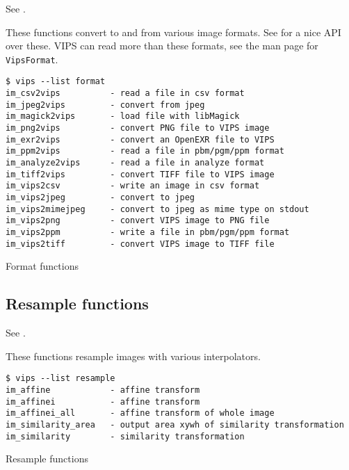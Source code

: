 See .

These functions convert to and from various image formats. See
 for a nice API over these. VIPS can read more than these
formats, see the man page for \verb+VipsFormat+.

\begin{fig2}
\begin{verbatim}
$ vips --list format
im_csv2vips          - read a file in csv format
im_jpeg2vips         - convert from jpeg
im_magick2vips       - load file with libMagick
im_png2vips          - convert PNG file to VIPS image
im_exr2vips          - convert an OpenEXR file to VIPS
im_ppm2vips          - read a file in pbm/pgm/ppm format
im_analyze2vips      - read a file in analyze format
im_tiff2vips         - convert TIFF file to VIPS image
im_vips2csv          - write an image in csv format
im_vips2jpeg         - convert to jpeg
im_vips2mimejpeg     - convert to jpeg as mime type on stdout
im_vips2png          - convert VIPS image to PNG file
im_vips2ppm          - write a file in pbm/pgm/ppm format
im_vips2tiff         - convert VIPS image to TIFF file
\end{verbatim}
\caption{Format functions}
\label{fg:format}
\end{fig2}

\subsection{Resample functions}

See .

These functions resample images with various interpolators.

\begin{fig2}
\begin{verbatim}
$ vips --list resample
im_affine            - affine transform
im_affinei           - affine transform
im_affinei_all       - affine transform of whole image
im_similarity_area   - output area xywh of similarity transformation
im_similarity        - similarity transformation
\end{verbatim}
\caption{Resample functions}
\label{fg:resample}
\end{fig2}
